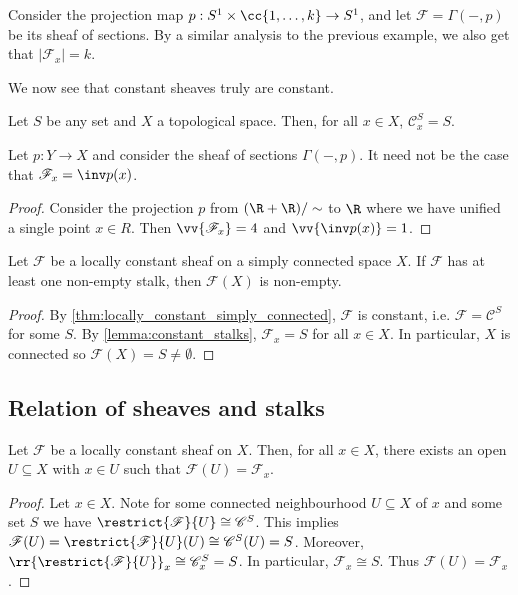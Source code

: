 \documentclass{article}
\begin{document}
\begin{example}
  Consider the projection map $p:S^1\times\cc{1,\ldots,k}\to S^1$, and let
  $\mathscr F = \Gamma(-, p)$ be its sheaf of sections. By a similar analysis to
  the previous example, we also get that $|\mathscr F_x| = k$.
\end{example}

We now see that constant sheaves truly are constant.

\begin{lemma}\label{lemma:constant_stalks}
  Let $S$ be any set and $X$ a topological space. Then, for all
  $x\in X$, $\mathscr C^S_x = S$.
\end{lemma}

\begin{example}
  Let $p:Y\to X$ and consider the sheaf of sections $\Gamma(-,p)$.
  It need not be the case that $\mathscr F_x = \inv p(x)$.
  \begin{proof}
    Consider the projection $p$ from $(\R+\R)/\sim$ to $\R$ where we have
    unified a single point $x\in R$. Then $\vv{\mathscr F_x}=4$
    and $\vv{\inv p(x)}=1$.
  \end{proof}
\end{example}

\begin{example}
  Let $\mathscr F$ be a locally constant sheaf on a simply connected space $X$.
  If $\mathscr F$ has at least one non-empty stalk, then $\mathscr F(X)$ is
  non-empty.
  \begin{proof}
    By \ref{thm:locally_constant_simply_connected},
    $\mathscr F$ is constant, i.e. $\mathscr F=\mathscr C^S$ for
    some $S$. By \ref{lemma:constant_stalks}, $\mathscr F_x = S$
    for all $x\in X$. In particular, $X$ is connected so
    $\mathscr F(X) = S \neq \emptyset$.
  \end{proof}
\end{example}

\subsection{Relation of sheaves and stalks}

\begin{lemma}\label{lemma:locally_constant_stalks}
  Let $\mathscr F$ be a locally constant sheaf on $X$. Then, for all $x\in X$,
  there exists an open $U\subseteq X$ with $x\in U$ such that $\mathscr
  F(U)=\mathscr F_x$.
  \begin{proof}
    Let $x\in X$. Note for some connected neighbourhood
    $U\subseteq X$ of $x$ and some
    set $S$ we have $\restrict{\mathscr F}{U} \cong \mathscr C^S$.
    This implies $\mathscr F(U) = \restrict{\mathscr F}{U}(U)
    \cong \mathscr C^S(U) = S$.
    Moreover, $\rr{\restrict{\mathscr F}{U}}_x \cong \mathscr C^S_x = S$.
    In particular, $\mathscr F_x \cong S$.
    Thus $\mathscr F(U) = \mathscr F_x$.
  \end{proof}
\end{lemma}
\end{document}
